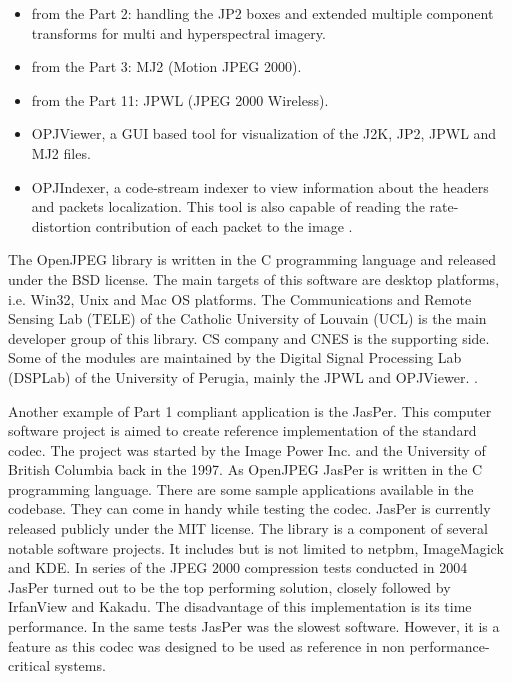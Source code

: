 \begin{itemize}
    \item from the Part 2: handling the JP2 boxes and extended multiple component
    transforms for multi and hyperspectral imagery.
    \item from the Part 3: MJ2 (Motion JPEG 2000).
    \item from the Part 11: JPWL (JPEG 2000 Wireless).
    \item OPJViewer, a GUI based tool for visualization of the J2K, JP2, JPWL and MJ2 files.
    \item OPJIndexer, a code-stream indexer to view information about the headers and packets localization.
    This tool is also capable of reading the rate-distortion contribution of each packet to the image \cite{jpeg_suite}.
\end{itemize}

The OpenJPEG library is written in the C programming language and released under the BSD license.
The main targets of this software are desktop platforms, i.e. Win32, Unix and Mac OS platforms.
The Communications and Remote Sensing Lab (TELE) of the Catholic University of Louvain (UCL)
is the main developer group of this library. CS company and CNES is the supporting side.
Some of the modules are maintained by the Digital Signal Processing Lab (DSPLab) of the University
of Perugia, mainly the JPWL and OPJViewer. \cite{jpeg_suite}.

Another example of Part 1 compliant application is the JasPer. This computer software project is aimed
to create reference implementation of the standard codec. The project was started by the Image Power Inc.
and the University of British Columbia back in the 1997. As OpenJPEG JasPer is written in the C programming language.
There are some sample applications available in the codebase. They can come in handy while testing the codec. 
JasPer is currently released publicly under the MIT license. The library is a component of several notable
software projects. It includes but is not limited to netpbm, ImageMagick and KDE. In series of the JPEG 2000
compression tests conducted in 2004 JasPer turned out to be the top performing solution, closely followed by
IrfanView and Kakadu. The disadvantage of this implementation is its time performance. In the same tests
JasPer was the slowest software. However, it is a feature as this codec was designed to be used as reference
in non performance-critical systems.

